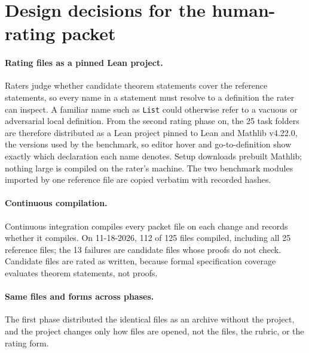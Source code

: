 \appendix
\section{Design decisions for the human-rating packet}
\label{app:design-decisions}

\paragraph{Rating files as a pinned Lean project.}
Raters judge whether candidate theorem statements cover the reference statements, so every name in a statement must resolve to a definition the rater can inspect.
A familiar name such as \texttt{List} could otherwise refer to a vacuous or adversarial local definition.
From the second rating phase on, the 25 task folders are therefore distributed as a Lean project pinned to Lean and Mathlib v4.22.0, the versions used by the benchmark, so editor hover and go-to-definition show exactly which declaration each name denotes.
Setup downloads prebuilt Mathlib; nothing large is compiled on the rater's machine.
The two benchmark modules imported by one reference file are copied verbatim with recorded hashes.

\paragraph{Continuous compilation.}
Continuous integration compiles every packet file on each change and records whether it compiles.
On 11-18-2026, 112 of 125 files compiled, including all 25 reference files; the 13 failures are candidate files whose proofs do not check.
Candidate files are rated as written, because formal specification coverage evaluates theorem statements, not proofs.

\paragraph{Same files and forms across phases.}
The first phase distributed the identical files as an archive without the project, and the project changes only how files are opened, not the files, the rubric, or the rating form.
